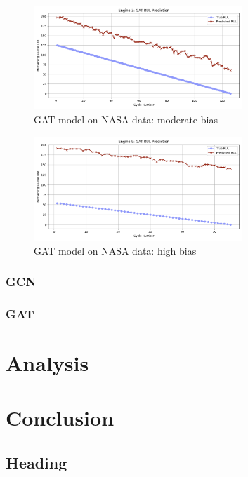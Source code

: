 \documentclass[12pt]{article}
\begin{document}
\begin{figure}[h!]
    \centering
    \includegraphics[width=0.7\textwidth]{figures/NASA/NASA_GAT_eng1.png} 
    \caption{GAT model on NASA data: moderate bias}
    \label{fig_NASA_GAT_eng1}
\end{figure}

\begin{figure}[h!]
    \centering
    \includegraphics[width=0.7\textwidth]{figures/NASA/NASA_GAT_eng3.png} 
    \caption{GAT model on NASA data: high bias}
    \label{fig_NASA_GAT_eng3}
\end{figure}


\subsubsection{GCN}
\subsubsection{GAT}

\pagebreak
\section{Analysis}

\pagebreak
\section{Conclusion}

\subsection{Heading}
\end{document}
